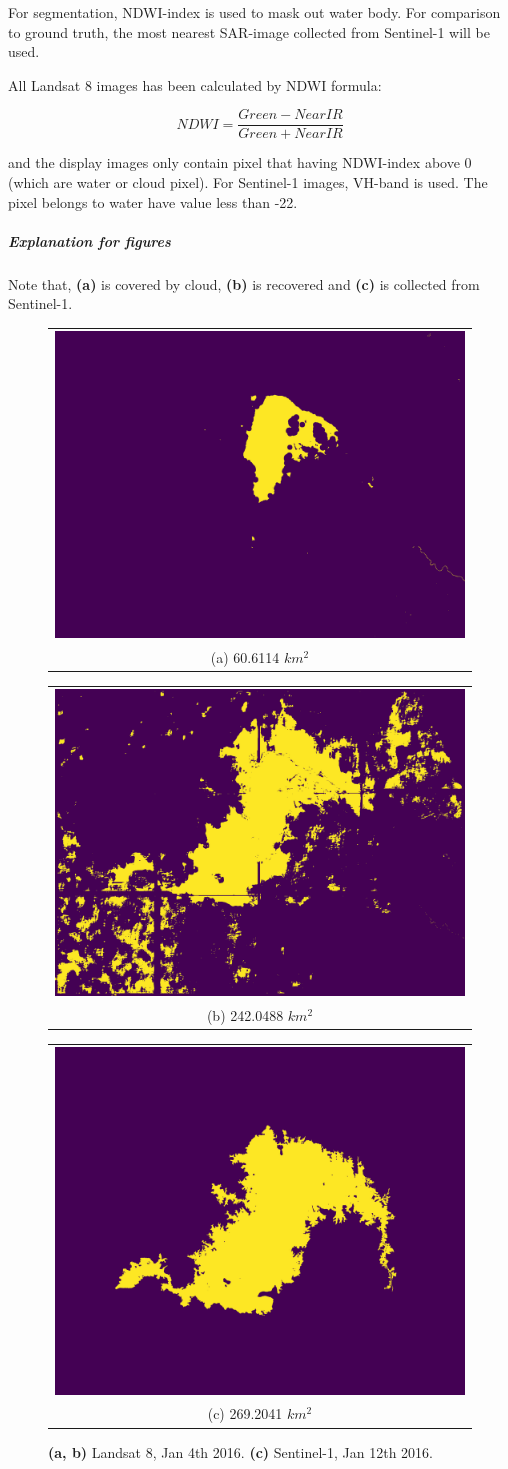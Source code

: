 For segmentation, NDWI-index is used to mask out water body. For comparison to ground truth, the most nearest SAR-image collected from Sentinel-1 will be used. 

All Landsat 8 images has been calculated by NDWI formula:

\begin{equation}
NDWI = \frac{Green - Near IR}{Green + Near IR}
\end{equation}

and the display images only contain pixel that having NDWI-index above 0 (which are water or cloud pixel). For Sentinel-1 images, VH-band is used. The pixel belongs to water have value less than -22.

\subparagraph{Explanation for figures} Note that, \textbf{(a)} is covered by cloud, \textbf{(b)} is recovered and \textbf{(c)} is collected from Sentinel-1. 

\begin{figure}[h!]
    \begin{center}
        \begin{tabular}[b]{c}
            \includegraphics[width=0.3\linewidth]{figures/raw20160104_60_6114.png} \\
            \small (a) 60.6114 $km^2$
          \end{tabular}
          \begin{tabular}[b]{c}
            \includegraphics[width=0.3\linewidth]{figures/r20160104_242_0488.png} \\
            \small (b) 242.0488 $km^2$
          \end{tabular}
          \begin{tabular}[b]{c}
              \includegraphics[width=0.3\linewidth]{figures/20160112_269_2041.png} \\
              \small (c) 269.2041 $km^2$
          \end{tabular} 
    \end{center}
    \caption{
		\textbf{(a, b)} Landsat 8, Jan 4th 2016.
		\textbf{(c)} Sentinel-1, Jan 12th 2016.}
\end{figure}


